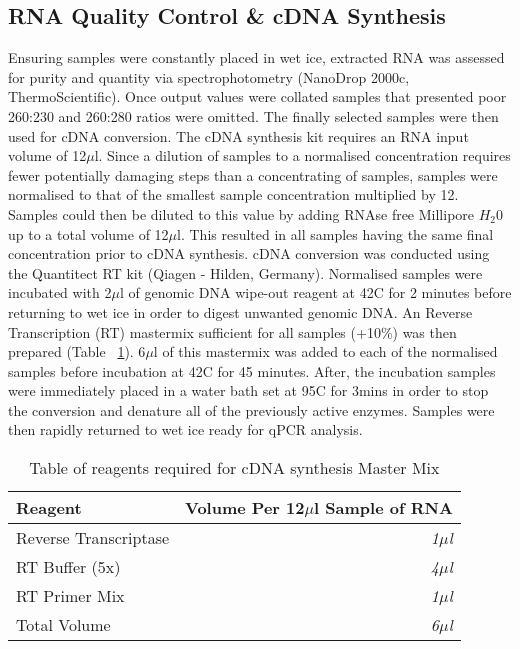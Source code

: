 \subsection{RNA Quality Control \& cDNA Synthesis} \label{RNAQuality&cDNA Synthesis}
Ensuring samples were constantly placed in wet ice, extracted RNA was assessed for purity and quantity via spectrophotometry (NanoDrop 2000c, ThermoScientific). Once output values were collated samples that presented poor 260:230 and 260:280 ratios were omitted. The finally selected samples were then used for cDNA conversion. The cDNA synthesis kit requires an RNA input volume of 12$\mu$l. Since a dilution of samples to a normalised concentration requires fewer potentially damaging steps than a concentrating of samples, samples were normalised to that of the smallest sample concentration multiplied by 12. Samples could then be diluted to this value by adding RNAse free Millipore $H_{2}0$ up to a total volume of 12$\mu$l. This resulted in all samples having the same final concentration prior to cDNA synthesis. 
cDNA conversion was conducted using the Quantitect RT kit (Qiagen - Hilden, Germany). Normalised samples were incubated with 2$\mu$l of genomic DNA wipe-out reagent at 42\degree C for 2 minutes before returning to wet ice in order to digest unwanted genomic DNA. An Reverse Transcription (RT) mastermix sufficient for all samples (+10\%) was then prepared (Table ~\ref{cDNA Synthesis Master Mix}). 6$\mu$l of this mastermix was added to each of the normalised samples before incubation at 42\degree C for 45 minutes. After, the incubation samples were immediately placed in a water bath set at 95\degree C for 3mins in order to stop the conversion and denature all of the previously active enzymes. Samples were then rapidly returned to wet ice ready for qPCR analysis. \\


\begin{table}[!hbtp]
\centering
\begin{tabular}{l | r }
Reagent & Volume Per 12$\mu$l Sample of RNA \\
\hline
Reverse Transcriptase & \textit{1$\mu$l} \\
RT Buffer (5x) & \textit{4$\mu$l} \\
RT Primer Mix & \textit{1$\mu$l} \\
Total Volume & \textit{6$\mu$l} \\
\end{tabular}
\caption[Table of reagents required for cDNA synthesis Master Mix]{Table of reagents required for cDNA synthesis Master Mix}
\label{cDNA Synthesis Master Mix}	
\end{table}

